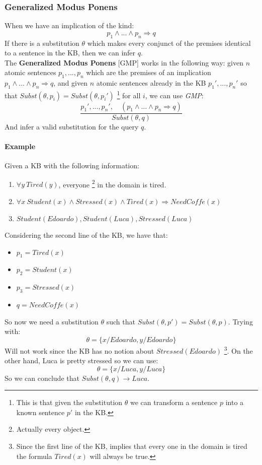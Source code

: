 \documentclass[10pt,a4paper]{article}
\begin{document}
\subsubsection{Generalized Modus Ponens}

When we have an implication of the kind:
\[p_1 \wedge ... \wedge p_n \Rightarrow q\]
If there is a substitution $\theta$ which makes every conjunct of the premises identical to a sentence in the KB, then we can infer $q$.\\
The \textbf{Generalized Modus Ponens} [GMP] works in the following way: given $n$ atomic sentences $p_1,...,p_n$ which are the premises of an implication $p_1\wedge ... \wedge p_n\Rightarrow q$, and given $n$ atomic sentences already in the KB $p_1',...,p_n'$ so that $Subst(\theta,p_i)=Subst(\theta,p_i')$ \footnote{This is that given the substitution $\theta$ we can transform a sentence $p$ into a known sentence $p'$ in the KB.} for all $i$, we can use \textit{GMP}:
\[\frac{p_1',...,p_n',\quad (p_1\wedge ... \wedge p_n\Rightarrow q)}{Subst(\theta,q)}\]
And infer a valid substitution for the query $q$.\\

\paragraph{Example}
Given a KB with the following information:
\begin{enumerate}
\item $\forall y\ Tired(y)$, everyone \footnote{Actually every object.} in the domain is tired.
\item $\forall x\ Student(x)\wedge Stressed(x) \wedge Tired(x) \Rightarrow NeedCoffe(x)$
\item $Student(Edoardo),Student(Luca), Stressed(Luca)$
\end{enumerate}

Considering the second line of the KB, we have that:
\begin{itemize}
\item $p_1=Tired(x)$
\item $p_2=Student(x)$
\item $p_3=Stressed(x)$
\item $q=NeedCoffe(x)$
\end{itemize}

So now we need a substitution $\theta$ such that $Subst(\theta,p')=Subst(\theta,p)$. Trying with:
\[\theta=\lbrace x/Edoardo, y/Edoardo \rbrace\]
Will not work since the KB has no notion about $Stressed(Edoardo)$ \footnote{Since the first line of the KB, implies that every one in the domain is tired the formula $Tired(x)$ will always be true. }. On the other hand, Luca is pretty stressed so we can use:
\[\theta=\lbrace x/Luca, y/Luca \rbrace\]
So we can conclude that $Subst(\theta, q)\longrightarrow Luca$.\\
\end{document}
